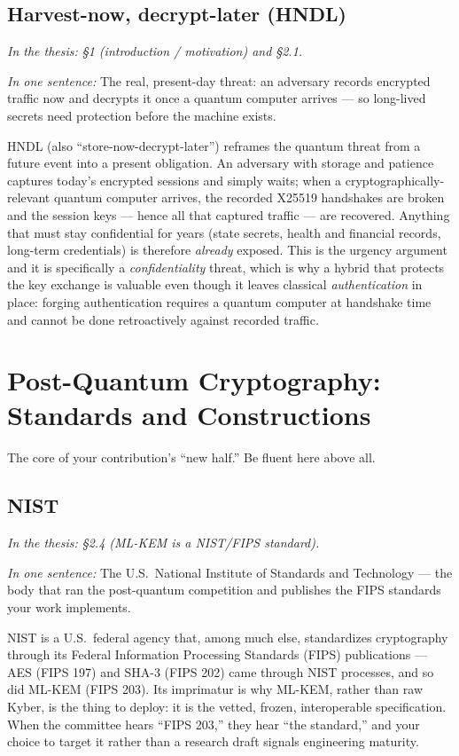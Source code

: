 \documentclass[11pt]{article}
\newcommand{\seethesis}[1]{%
  {\small\color{softgray}\textit{In the thesis: #1}}\par\vspace{3pt}}
\newcommand{\nutshell}[1]{\noindent\textit{In one sentence:} #1\par\vspace{4pt}}
\begin{document}
\subsection{Harvest-now, decrypt-later (HNDL)}
\seethesis{\S1 (introduction / motivation) and \S2.1.}
\nutshell{The real, present-day threat: an adversary records encrypted traffic
now and decrypts it once a quantum computer arrives --- so long-lived secrets
need protection before the machine exists.}

HNDL (also ``store-now-decrypt-later'') reframes the quantum threat from a future
event into a present obligation. An adversary with storage and patience captures
today's encrypted sessions and simply waits; when a cryptographically-relevant
quantum computer arrives, the recorded X25519 handshakes are broken and the
session keys --- hence all that captured traffic --- are recovered. Anything that
must stay confidential for years (state secrets, health and financial records,
long-term credentials) is therefore \emph{already} exposed. This is the urgency
argument and it is specifically a \emph{confidentiality} threat, which is why a
hybrid that protects the key exchange is valuable even though it leaves classical
\emph{authentication} in place: forging authentication requires a quantum
computer at handshake time and cannot be done retroactively against recorded
traffic.

\section{Post-Quantum Cryptography: Standards and Constructions}
The core of your contribution's ``new half.'' Be fluent here above all.

\subsection{NIST}
\seethesis{\S2.4 (ML-KEM is a NIST/FIPS standard).}
\nutshell{The U.S.\ National Institute of Standards and Technology --- the body
that ran the post-quantum competition and publishes the FIPS standards your work
implements.}

NIST is a U.S.\ federal agency that, among much else, standardizes cryptography
through its Federal Information Processing Standards (FIPS) publications --- AES
(FIPS 197) and SHA-3 (FIPS 202) came through NIST processes, and so did ML-KEM
(FIPS 203). Its imprimatur is why ML-KEM, rather than raw Kyber, is the thing to
deploy: it is the vetted, frozen, interoperable specification. When the committee
hears ``FIPS 203,'' they hear ``the standard,'' and your choice to target it
rather than a research draft signals engineering maturity.
\end{document}

